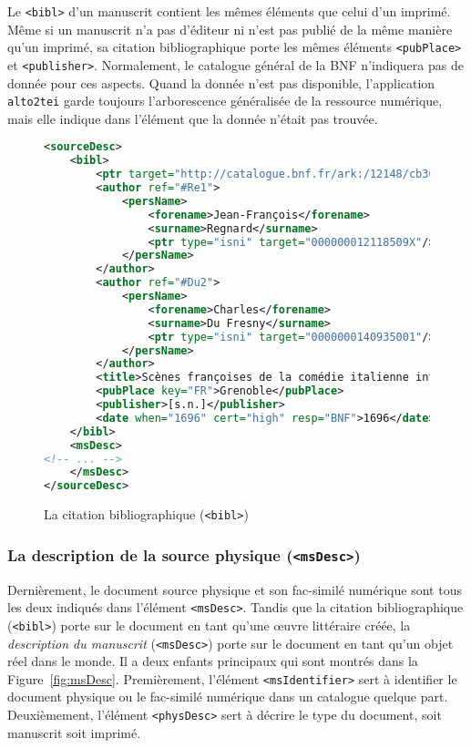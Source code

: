 \documentclass[class=article, crop=false]{standalone}
\begin{document}
Le \texttt{<bibl>} d'un manuscrit contient les mêmes éléments que celui d'un imprimé. Même si un manuscrit n'a pas d'éditeur ni n'est pas publié de la même manière qu'un imprimé, sa citation bibliographique porte les mêmes éléments \texttt{<pubPlace>} et \texttt{<publisher>}. Normalement, le catalogue général de la \acrshort{BNF} n'indiquera pas de donnée pour ces aspects. Quand la donnée n'est pas disponible, l'application \texttt{alto2tei} garde toujours l'arborescence généralisée de la ressource numérique, mais elle indique dans l'élément que la donnée n'était pas trouvée.

\begin{figure}[htp]
\centering
\begin{lstlisting}[language=XML]
<sourceDesc>
	<bibl>
		<ptr target="http://catalogue.bnf.fr/ark:/12148/cb30369299r"/>
		<author ref="#Re1">
			<persName>
				<forename>Jean-François</forename>
				<surname>Regnard</surname>
				<ptr type="isni" target="000000012118509X"/>
			</persName>
		</author>
		<author ref="#Du2">
			<persName>
				<forename>Charles</forename>
				<surname>Du Fresny</surname>
				<ptr type="isni" target="0000000140935001"/>
			</persName>
		</author>
		<title>Scènes françoises de la comédie italienne intitulée "la Foire S.-Germain" , comme elles ont paru dans les premières représentations</title>
		<pubPlace key="FR">Grenoble</pubPlace>
		<publisher>[s.n.]</publisher>
		<date when="1696" cert="high" resp="BNF">1696</date>
	</bibl>
	<msDesc>
<!-- ... -->
	</msDesc>
</sourceDesc>

\end{lstlisting}
\caption{La citation bibliographique (\texttt{<bibl>})}
\label{fig:bibl}
\end{figure}


\subsubsection{La description de la source physique (\texttt{<msDesc>})}
Dernièrement, le document source physique et son fac-similé numérique sont tous les deux indiqués dans l'élément \texttt{<msDesc>}. Tandis que la citation bibliographique (\texttt{<bibl>}) porte sur le document en tant qu'une œuvre littéraire créée, la \textit{description du manuscrit} (\texttt{<msDesc>}) porte sur le document en tant qu'un objet réel dans le monde. Il a deux enfants principaux qui sont montrés dans la Figure~\ref{fig:msDesc}. Premièrement, l'élément \texttt{<msIdentifier>} sert à identifier le document physique ou le fac-similé numérique dans un catalogue quelque part. Deuxièmement, l'élément \texttt{<physDesc>} sert à décrire le type du document, soit manuscrit soit imprimé.
\end{document}
